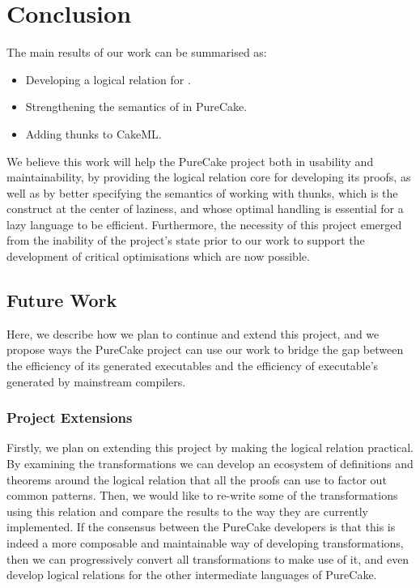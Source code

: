 \chapter{Conclusion}

The main results of our work can be summarised as:
\begin{itemize}
\item Developing a logical relation for \ThunkLang{}.
\item Strengthening the semantics of  in PureCake.
\item Adding thunks to CakeML.
\end{itemize}

We believe this work will help the PureCake project both in usability and
maintainability, by providing the logical relation core for developing its
proofs, as well as by better specifying the semantics of working with thunks,
which is the construct at the center of laziness, and whose optimal handling is
essential for a lazy language to be efficient. Furthermore, the necessity of
this project emerged from the inability of the project's state prior to our work
to support the development of critical optimisations which are now possible.

\section{Future Work}

Here, we describe how we plan to continue and extend this project, and we
propose ways the PureCake project can use our work to bridge the gap between the
efficiency of its generated executables and the efficiency of executable's
generated by mainstream compilers.

\subsection{Project Extensions}

Firstly, we plan on extending this project by making the logical relation
practical. By examining the \ThunkLang{} transformations we can develop an
ecosystem of definitions and theorems around the logical relation that all the
proofs can use to factor out common patterns. Then, we would like to re-write
some of the transformations using this relation and compare the results to the
way they are currently implemented. If the consensus between the PureCake
developers is that this is indeed a more composable and maintainable way of
developing transformations, then we can progressively convert all
transformations to make use of it, and even develop logical relations for the
other intermediate languages of PureCake.

